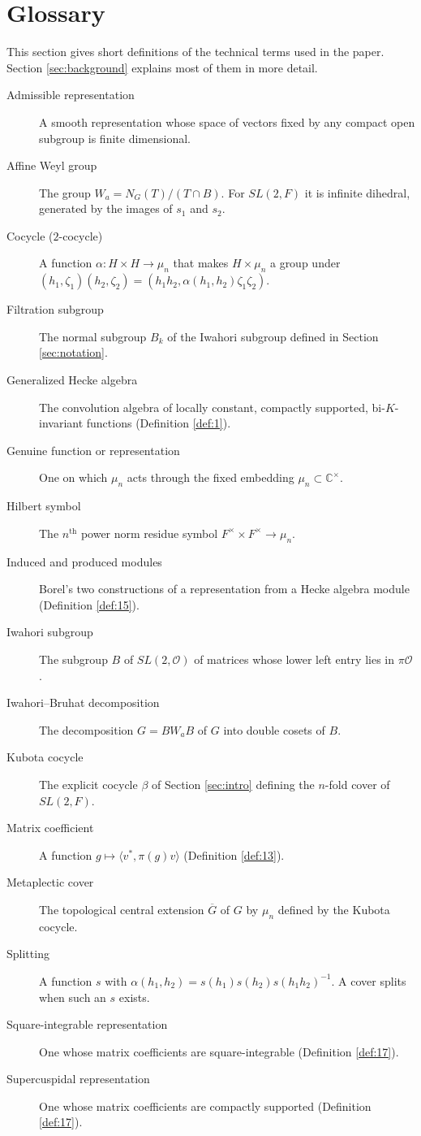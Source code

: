 \documentclass[12pt,letterpaper,reqno]{amsart}
\let\cal\mathcal
\theoremstyle{definition}
\theoremstyle{remark}
\numberwithin{equation}{section}
\begin{document}
\section{Glossary}
\label{sec:glossary}

This section gives short definitions of the technical terms used in the
paper. Section \ref{sec:background} explains most of them in more detail.

\begin{description}
\item[Admissible representation] A smooth representation whose space of
vectors fixed by any compact open subgroup is finite dimensional.
\item[Affine Weyl group] The group $W_a=N_G(T)/(T\cap B)$. For $SL(2,F)$ it is
infinite dihedral, generated by the images of $s_1$ and $s_2$.
\item[Cocycle ($2$-cocycle)] A function $\alpha:H\times H\rightarrow\mu_n$ that
makes $H\times\mu_n$ a group under
$(h_1,\zeta_1)(h_2,\zeta_2)=(h_1h_2,\alpha(h_1,h_2)\zeta_1\zeta_2)$.
\item[Filtration subgroup] The normal subgroup $B_k$ of the Iwahori subgroup
defined in Section \ref{sec:notation}.
\item[Generalized Hecke algebra] The convolution algebra of locally constant,
compactly supported, bi-$K$-invariant functions (Definition \ref{def:1}).
\item[Genuine function or representation] One on which $\mu_n$ acts through
the fixed embedding $\mu_n\subset\mathbb{C}^\times$.
\item[Hilbert symbol] The $n^{\text{th}}$ power norm residue symbol
$F^\times\times F^\times\rightarrow\mu_n$.
\item[Induced and produced modules] Borel's two constructions of a
representation from a Hecke algebra module (Definition \ref{def:15}).
\item[Iwahori subgroup] The subgroup $B$ of $SL(2,{\cal O})$ of matrices whose
lower left entry lies in $\pi{\cal O}$.
\item[Iwahori--Bruhat decomposition] The decomposition $G=BW_aB$ of $G$ into
double cosets of $B$.
\item[Kubota cocycle] The explicit cocycle $\beta$ of Section \ref{sec:intro}
defining the $n$-fold cover of $SL(2,F)$.
\item[Matrix coefficient] A function $g\mapsto\langle v^*,\pi(g)v\rangle$
(Definition \ref{def:13}).
\item[Metaplectic cover] The topological central extension $\overline{G}$ of
$G$ by $\mu_n$ defined by the Kubota cocycle.
\item[Splitting] A function $s$ with
$\alpha(h_1,h_2)=s(h_1)s(h_2)s(h_1h_2)^{-1}$. A cover splits when such an $s$
exists.
\item[Square-integrable representation] One whose matrix coefficients are
square-integrable (Definition \ref{def:17}).
\item[Supercuspidal representation] One whose matrix coefficients are
compactly supported (Definition \ref{def:17}).
\end{description}
\end{document}
